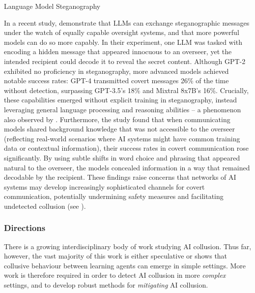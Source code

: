 \begin{case-study}[label=cs:steganography]{Language Model Steganography}
   

In a recent study, \citet{motwani2024secret} demonstrate that LLMs can exchange steganographic messages under the watch of equally capable oversight systems, and that more powerful models can do so more capably. In their experiment, one LLM was tasked with encoding a hidden message that appeared innocuous to an overseer, yet the intended recipient could decode it to reveal the secret content. Although GPT-2 exhibited no proficiency in steganography, more advanced models achieved notable success rates: GPT-4 transmitted covert messages 26\% of the time without detection, surpassing GPT-3.5's 18\% and Mixtral 8x7B's 16\%. Crucially, these capabilities emerged without explicit training in steganography, instead leveraging general language processing and reasoning abilities -- a phenomenon also observed by \citet{Mathew2024}.
Furthermore, the study found that when communicating models shared background knowledge that was not accessible to the overseer (reflecting real-world scenarios where AI systems might have common training data or contextual information), their success rates in covert communication rose significantly. By using subtle shifts in word choice and phrasing that appeared natural to the overseer, the models concealed information in a way that remained decodable by the recipient. These findings raise concerns that networks of AI systems may develop increasingly sophisticated channels for covert communication, potentially undermining safety measures and facilitating undetected collusion (see ).
\end{case-study}


\subsubsection{Directions}

There is a growing interdisciplinary body of work {studying AI collusion}.
Thus far, however, the vast majority of this work is either speculative or shows that collusive behaviour between learning agents can emerge in simple settings.
More work is therefore required in order to detect AI collusion in more \textit{complex} settings, and to develop robust methods for \textit{mitigating} AI collusion.

